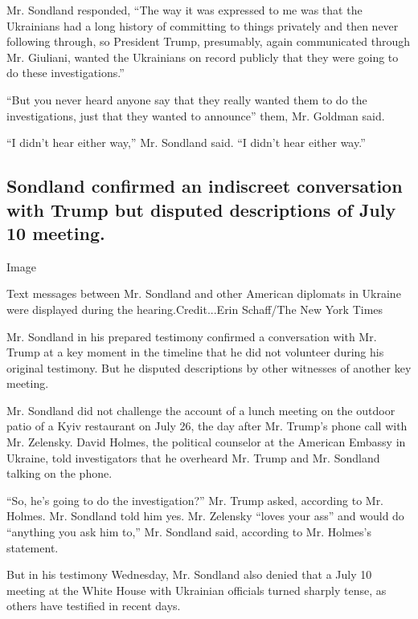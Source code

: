 Mr. Sondland responded, ``The way it was expressed to me was that the
Ukrainians had a long history of committing to things privately and then
never following through, so President Trump, presumably, again
communicated through Mr. Giuliani, wanted the Ukrainians on record
publicly that they were going to do these investigations.''

``But you never heard anyone say that they really wanted them to do the
investigations, just that they wanted to announce'' them, Mr. Goldman
said.

``I didn't hear either way,'' Mr. Sondland said. ``I didn't hear either
way.''

\hypertarget{sondland-confirmed-an-indiscreet-conversation-with-trump-but-disputed-descriptions-of-july-10-meeting}{%
\subsection{Sondland confirmed an indiscreet conversation with Trump but
disputed descriptions of July 10
meeting.}\label{sondland-confirmed-an-indiscreet-conversation-with-trump-but-disputed-descriptions-of-july-10-meeting}}

Image

Text messages between Mr. Sondland and other American diplomats in
Ukraine were displayed during the hearing.Credit...Erin Schaff/The New
York Times

Mr. Sondland in his prepared testimony confirmed a conversation with Mr.
Trump at a key moment in the timeline that he did not volunteer during
his original testimony. But he disputed descriptions by other witnesses
of another key meeting.

Mr. Sondland did not challenge the account of a lunch meeting on the
outdoor patio of a Kyiv restaurant on July 26, the day after Mr. Trump's
phone call with Mr. Zelensky. David Holmes, the political counselor at
the American Embassy in Ukraine, told investigators that he overheard
Mr. Trump and Mr. Sondland talking on the phone.

``So, he's going to do the investigation?'' Mr. Trump asked, according
to Mr. Holmes. Mr. Sondland told him yes. Mr. Zelensky ``loves your
ass'' and would do ``anything you ask him to,'' Mr. Sondland said,
according to Mr. Holmes's statement.

But in his testimony Wednesday, Mr. Sondland also denied that a July 10
meeting at the White House with Ukrainian officials turned sharply
tense, as others have testified in recent days.

